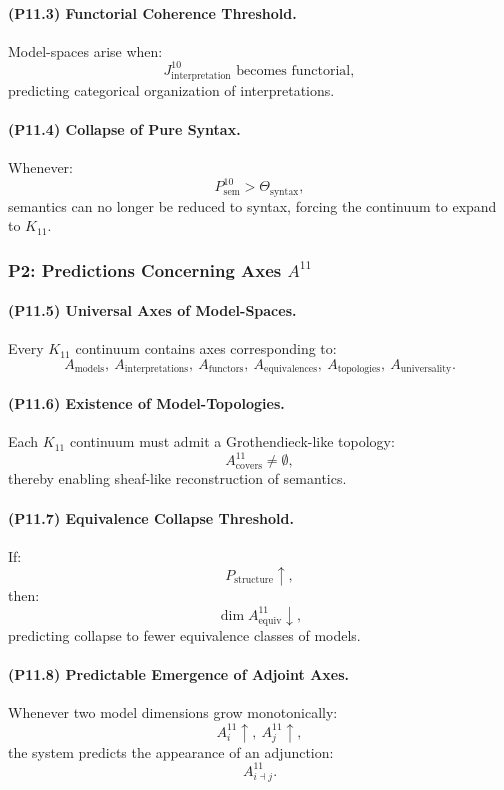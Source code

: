 \paragraph{(P11.3) Functorial Coherence Threshold.}
Model-spaces arise when:
\[
J_{\mathrm{interpretation}}^{10} 
\text{ becomes functorial},
\]
predicting categorical organization of interpretations.

\paragraph{(P11.4) Collapse of Pure Syntax.}
Whenever:
\[
P_{\mathrm{sem}}^{10} > \Theta_{\mathrm{syntax}},
\]
semantics can no longer be reduced to syntax,  
forcing the continuum to expand to $K_{11}$.

\subsubsection{P2: Predictions Concerning Axes $A^{11}$}

\paragraph{(P11.5) Universal Axes of Model-Spaces.}
Every $K_{11}$ continuum contains axes corresponding to:
\[
A_{\mathrm{models}},\
A_{\mathrm{interpretations}},\
A_{\mathrm{functors}},\
A_{\mathrm{equivalences}},\
A_{\mathrm{topologies}},\
A_{\mathrm{universality}}.
\]

\paragraph{(P11.6) Existence of Model-Topologies.}
Each $K_{11}$ continuum must admit a Grothendieck-like topology:
\[
A_{\mathrm{covers}}^{11} \neq \emptyset,
\]
thereby enabling sheaf-like reconstruction of semantics.

\paragraph{(P11.7) Equivalence Collapse Threshold.}
If:
\[
P_{\mathrm{structure}} \uparrow,
\]
then:
\[
\dim A_{\mathrm{equiv}}^{11} \downarrow,
\]
predicting collapse to fewer equivalence classes of models.

\paragraph{(P11.8) Predictable Emergence of Adjoint Axes.}
Whenever two model dimensions grow monotonically:
\[
A_i^{11} \uparrow,\ 
A_j^{11} \uparrow,
\]
the system predicts the appearance of an adjunction:
\[
A_{i \dashv j}^{11}.
\]

